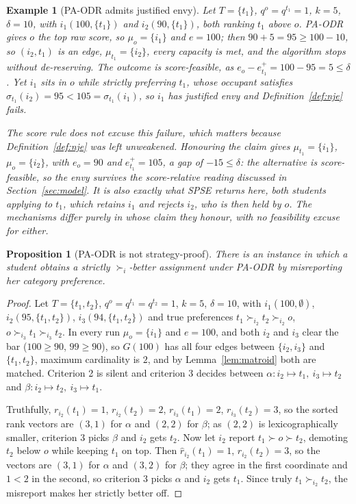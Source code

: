 \documentclass[a4paper,twoside]{article}
\newtheorem{proposition}{Proposition}
\newtheorem{example}{Example}
\theoremstyle{definition}
\begin{document}
\begin{example}[PA-ODR admits justified envy]
\label{ex:paodr-envy}
Let $T=\{t_1\}$, $q^o=q^{t_1}=1$, $k=5$, $\delta=10$, with $i_1(100,\{t_1\})$ and $i_2(90,\{t_1\})$, both ranking $t_1$ above $o$. PA-ODR gives $o$ the top raw score, so $\mu_o=\{i_1\}$ and $e=100$; then $90+5=95\ge100-10$, so $(i_2,t_1)$ is an edge, $\mu_{t_1}=\{i_2\}$, every capacity is met, and the algorithm stops without de-reserving. The outcome is score-feasible, as $e_o-e_{t_1}^+=100-95=5\le\delta$. Yet $i_1$ sits in $o$ while strictly preferring $t_1$, whose occupant satisfies $\sigma_{t_1}(i_2)=95<105=\sigma_{t_1}(i_1)$, so $i_1$ has justified envy and Definition~\ref{def:nje} fails.

The score rule does not excuse this failure, which matters because Definition~\ref{def:nje} was left unweakened. Honouring the claim gives $\mu_{t_1}=\{i_1\}$, $\mu_o=\{i_2\}$, with $e_o=90$ and $e_{t_1}^+=105$, a gap of $-15\le\delta$: the alternative is score-feasible, so the envy survives the score-relative reading discussed in Section~\ref{sec:model}. It is also exactly what SPSE returns here, both students applying to $t_1$, which retains $i_1$ and rejects $i_2$, who is then held by $o$. The mechanisms differ purely in whose claim they honour, with no feasibility excuse for either.
\end{example}

\begin{proposition}[PA-ODR is not strategy-proof]
\label{prop:paodr-notsp}
There is an instance in which a student obtains a strictly $\succ_i$-better assignment under PA-ODR by misreporting her category preference.
\end{proposition}

\begin{proof}
Let $T=\{t_1,t_2\}$, $q^o=q^{t_1}=q^{t_2}=1$, $k=5$, $\delta=10$, with $i_1(100,\emptyset)$, $i_2(95,\{t_1,t_2\})$, $i_3(94,\{t_1,t_2\})$ and true preferences $t_1\succ_{i_2}t_2\succ_{i_2}o$, $o\succ_{i_3}t_1\succ_{i_3}t_2$. In every run $\mu_o=\{i_1\}$ and $e=100$, and both $i_2$ and $i_3$ clear the bar ($100\ge90$, $99\ge90$), so $G(100)$ has all four edges between $\{i_2,i_3\}$ and $\{t_1,t_2\}$, maximum cardinality is $2$, and by Lemma~\ref{lem:matroid} both are matched. Criterion 2 is silent and criterion 3 decides between $\alpha:i_2\mapsto t_1,\ i_3\mapsto t_2$ and $\beta:i_2\mapsto t_2,\ i_3\mapsto t_1$.

Truthfully, $r_{i_2}(t_1)=1$, $r_{i_2}(t_2)=2$, $r_{i_3}(t_1)=2$, $r_{i_3}(t_2)=3$, so the sorted rank vectors are $(3,1)$ for $\alpha$ and $(2,2)$ for $\beta$; as $(2,2)$ is lexicographically smaller, criterion 3 picks $\beta$ and $i_2$ gets $t_2$. Now let $i_2$ report $t_1\succ o\succ t_2$, demoting $t_2$ below $o$ while keeping $t_1$ on top. Then $\hat r_{i_2}(t_1)=1$, $\hat r_{i_2}(t_2)=3$, so the vectors are $(3,1)$ for $\alpha$ and $(3,2)$ for $\beta$; they agree in the first coordinate and $1<2$ in the second, so criterion 3 picks $\alpha$ and $i_2$ gets $t_1$. Since truly $t_1\succ_{i_2}t_2$, the misreport makes her strictly better off.
\end{proof}
\end{document}
